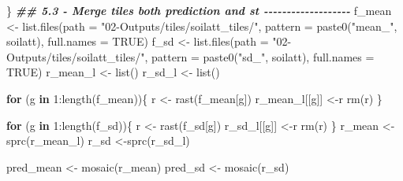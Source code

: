 \documentclass[
  10pt,
  b5paper,
  oneside]{book}
\newenvironment{Shaded}{\begin{snugshade}}{\end{snugshade}}
\newcommand{\AttributeTok}[1]{\textcolor[rgb]{0.77,0.63,0.00}{#1}}
\newcommand{\ConstantTok}[1]{\textcolor[rgb]{0.00,0.00,0.00}{#1}}
\newcommand{\ControlFlowTok}[1]{\textcolor[rgb]{0.13,0.29,0.53}{\textbf{#1}}}
\newcommand{\DecValTok}[1]{\textcolor[rgb]{0.00,0.00,0.81}{#1}}
\newcommand{\DocumentationTok}[1]{\textcolor[rgb]{0.56,0.35,0.01}{\textbf{\textit{#1}}}}
\newcommand{\FunctionTok}[1]{\textcolor[rgb]{0.00,0.00,0.00}{#1}}
\newcommand{\NormalTok}[1]{#1}
\newcommand{\OtherTok}[1]{\textcolor[rgb]{0.56,0.35,0.01}{#1}}
\newcommand{\SpecialCharTok}[1]{\textcolor[rgb]{0.00,0.00,0.00}{#1}}
\newcommand{\StringTok}[1]{\textcolor[rgb]{0.31,0.60,0.02}{#1}}
\begin{document}
\begin{Shaded}
\begin{Highlighting}[]
\NormalTok{  \}}
  \DocumentationTok{\#\# 5.3 {-} Merge tiles both prediction and st {-}{-}{-}{-}{-}{-}{-}{-}{-}{-}{-}{-}{-}{-}{-}{-}{-}{-}{-}}
\NormalTok{  f\_mean }\OtherTok{\textless{}{-}} \FunctionTok{list.files}\NormalTok{(}\AttributeTok{path =} \StringTok{"02{-}Outputs/tiles/soilatt\_tiles/"}\NormalTok{, }
                     \AttributeTok{pattern =} \FunctionTok{paste0}\NormalTok{(}\StringTok{"mean\_"}\NormalTok{, soilatt), }
                     \AttributeTok{full.names =} \ConstantTok{TRUE}\NormalTok{)}
\NormalTok{  f\_sd }\OtherTok{\textless{}{-}} \FunctionTok{list.files}\NormalTok{(}\AttributeTok{path =} \StringTok{"02{-}Outputs/tiles/soilatt\_tiles/"}\NormalTok{, }
                     \AttributeTok{pattern =}  \FunctionTok{paste0}\NormalTok{(}\StringTok{"sd\_"}\NormalTok{, soilatt), }
                     \AttributeTok{full.names =} \ConstantTok{TRUE}\NormalTok{)}
\NormalTok{  r\_mean\_l }\OtherTok{\textless{}{-}} \FunctionTok{list}\NormalTok{()}
\NormalTok{  r\_sd\_l }\OtherTok{\textless{}{-}} \FunctionTok{list}\NormalTok{()}
  
  \ControlFlowTok{for}\NormalTok{ (g }\ControlFlowTok{in} \DecValTok{1}\SpecialCharTok{:}\FunctionTok{length}\NormalTok{(f\_mean))\{}
\NormalTok{    r }\OtherTok{\textless{}{-}} \FunctionTok{rast}\NormalTok{(f\_mean[g])}
\NormalTok{    r\_mean\_l[[g]] }\OtherTok{\textless{}{-}}\NormalTok{r}
    \FunctionTok{rm}\NormalTok{(r)}
\NormalTok{  \}}

  \ControlFlowTok{for}\NormalTok{ (g }\ControlFlowTok{in} \DecValTok{1}\SpecialCharTok{:}\FunctionTok{length}\NormalTok{(f\_sd))\{}
\NormalTok{    r }\OtherTok{\textless{}{-}} \FunctionTok{rast}\NormalTok{(f\_sd[g])}
\NormalTok{    r\_sd\_l[[g]] }\OtherTok{\textless{}{-}}\NormalTok{r}
    \FunctionTok{rm}\NormalTok{(r)}
\NormalTok{  \}}
\NormalTok{  r\_mean }\OtherTok{\textless{}{-}}\FunctionTok{sprc}\NormalTok{(r\_mean\_l)}
\NormalTok{  r\_sd }\OtherTok{\textless{}{-}}\FunctionTok{sprc}\NormalTok{(r\_sd\_l)}
  
\NormalTok{  pred\_mean }\OtherTok{\textless{}{-}} \FunctionTok{mosaic}\NormalTok{(r\_mean)}
\NormalTok{  pred\_sd }\OtherTok{\textless{}{-}} \FunctionTok{mosaic}\NormalTok{(r\_sd)}
  

\end{Highlighting}
\end{Shaded}
\end{document}
